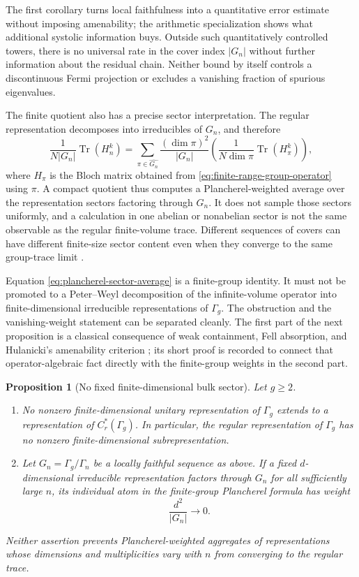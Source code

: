 \documentclass[11pt]{article}
\newtheorem{proposition}[theorem]{Proposition}
\theoremstyle{definition}
\theoremstyle{remark}
\newcommand{\Tr}{\operatorname{Tr}}
\begin{document}
The first corollary turns local faithfulness into a quantitative error
estimate without imposing amenability; the arithmetic specialization shows
what additional systolic information buys.  Outside such quantitatively
controlled towers, there is no universal rate in the cover index \(|G_n|\)
without further information about the residual chain.  Neither bound by
itself controls a discontinuous Fermi projection or excludes a vanishing
fraction of spurious eigenvalues.

The finite quotient also has a precise sector interpretation.  The regular
representation decomposes into irreducibles of \(G_n\), and therefore
\[
 \frac{1}{N|G_n|}\Tr(H_n^k)
   =
 \sum_{\pi\in\widehat{G_n}}
    \frac{(\dim\pi)^2}{|G_n|}
    \left(
      \frac{1}{N\dim\pi}\Tr(H_\pi^k)
    \right),
 \tag{10.6}\label{eq:plancherel-sector-average}
\]
where \(H_\pi\) is the Bloch matrix obtained from
\eqref{eq:finite-range-group-operator} using \(\pi\).  A compact quotient
thus computes a Plancherel-weighted average over the representation sectors
factoring through \(G_n\).  It does not sample those sectors uniformly, and a
calculation in one abelian or nonabelian sector is not the same observable as
the regular finite-volume trace.  Different sequences of covers can have
different finite-size sector content even when they converge to the same
group-trace limit
\cite{MaciejkoRayan2022,LenggenhagerEtAl2023}.

Equation \eqref{eq:plancherel-sector-average} is a finite-group identity.  It
must not be promoted to a Peter--Weyl decomposition of the infinite-volume
operator into finite-dimensional irreducible representations of
\(\Gamma_g\).  The obstruction and the vanishing-weight statement can be
separated cleanly.  The first part of the next proposition is a classical
consequence of weak containment, Fell absorption, and Hulanicki's amenability
criterion \cite{Hulanicki1964}; its short proof is recorded to connect that
operator-algebraic fact directly with the finite-group weights in the second
part.

\begin{proposition}[No fixed finite-dimensional bulk sector]
\label{prop:no-finite-dimensional-bulk}
Let \(g\geq2\).
\begin{enumerate}[label=\textup{(\alph*)},leftmargin=2.5em]
\item No nonzero finite-dimensional unitary representation of \(\Gamma_g\)
  extends to a representation of \(C_r^*(\Gamma_g)\).  In particular, the
  regular representation of \(\Gamma_g\) has no nonzero finite-dimensional
  subrepresentation.
\item Let \(G_n=\Gamma_g/\Gamma_n\) be a locally faithful sequence as above.
  If a fixed \(d\)-dimensional irreducible representation factors through
  \(G_n\) for all sufficiently large \(n\), its individual atom in the
  finite-group Plancherel formula has weight
  \[
                         \frac{d^2}{|G_n|}\longrightarrow0.
  \]
\end{enumerate}
Neither assertion prevents Plancherel-weighted aggregates of representations
whose dimensions and multiplicities vary with \(n\) from converging to the
regular trace.
\end{proposition}
\end{document}
